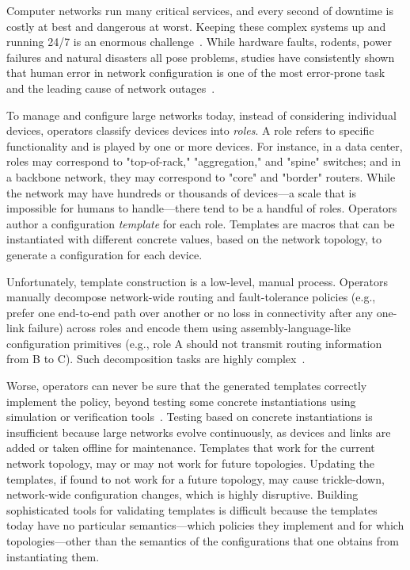 \documentclass[numbers, 10pt, preprint]{sigplanconf}
\begin{document}


Computer networks run many critical services, and every second of downtime is
costly at best and dangerous at worst.  Keeping these complex systems up and running 24/7 is an enormous challenge~\cite{mahajan+:bgp-misconfiguration,feamster+:rcc,batfish,dc-failure-study}.
%
While hardware faults, rodents, power failures and natural disasters all pose problems, studies have consistently shown that human error in network configuration is one of the most error-prone task and the leading cause of network outages~\cite{juniper-study,xx}.

To manage and configure large networks today, instead of considering individual devices, operators classify devices devices into {\em roles}. A role refers to specific functionality and is played by one or more devices. For instance, in a data center, roles may correspond to "top-of-rack," "aggregation," and "spine" switches; and in a backbone network, they may correspond to "core" and "border" routers. While the network may have hundreds or thousands of devices---a scale that is impossible for humans to handle---there tend to be a handful of roles.
%
Operators author a configuration {\em template} for each role. Templates are macros that can be instantiated with different concrete values, based on the network topology, to generate a configuration for each device.

Unfortunately, template construction is a low-level, manual process. Operators manually decompose network-wide routing and fault-tolerance policies (e.g., prefer one end-to-end path over another or no loss in connectivity after any one-link failure) across roles and encode them using assembly-language-like configuration primitives (e.g., role A should not transmit routing information from B to C). Such decomposition tasks are highly complex~\cite{propane}.

Worse, operators can never be sure that the generated templates correctly implement the policy,  beyond testing some concrete instantiations using simulation or verification tools~\cite{x,y}. Testing based on concrete instantiations is insufficient because large networks evolve continuously, as devices and links are added or taken offline for maintenance. Templates that work for the current network topology, may or may not work for future topologies. Updating the templates, if found to not work for a future topology, may cause trickle-down, network-wide configuration changes, which is highly disruptive. Building sophisticated tools for validating templates is difficult because the templates today have no particular semantics---which policies they implement and for which topologies---other than the semantics of the configurations that one obtains from instantiating them.
\end{document}
